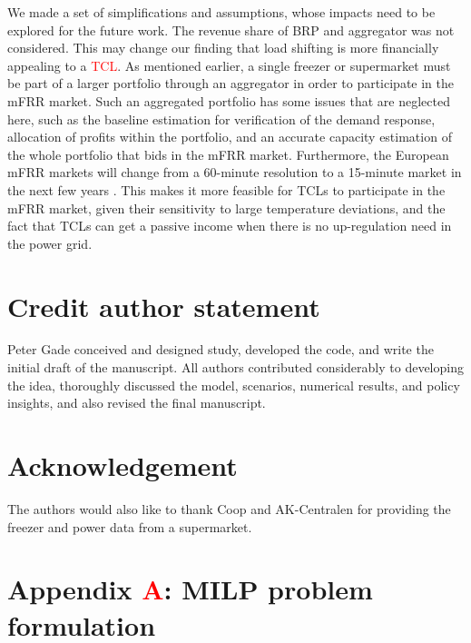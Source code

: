 \documentclass[11pt,a4paper]{article}
\begin{document}
We made a set of simplifications and assumptions, whose impacts need to be explored for the future work. The revenue share of BRP and aggregator was not considered. This may change our finding that load shifting is more financially appealing to a \textcolor{red}{TCL}. As mentioned earlier, a single freezer or supermarket must be part of a larger portfolio through an aggregator in order to participate in the mFRR market. Such an aggregated portfolio has some issues that are neglected here, such as the baseline estimation for verification of the demand response, allocation of profits within the portfolio, and an accurate capacity estimation of the whole portfolio that bids in the mFRR market. Furthermore, the European mFRR markets will change from a 60-minute resolution to a 15-minute market in the next few years \cite{MARI}. This makes it more feasible for TCLs to participate in the mFRR market, given their sensitivity to large temperature deviations, and the fact that TCLs can get a passive income when there is no up-regulation need in the power grid.

\section*{Credit author statement}
Peter Gade conceived and designed study, developed the code, and write the initial draft of the manuscript. All authors contributed considerably to developing the idea, thoroughly discussed the model, scenarios, numerical results, and policy insights, and also revised the final manuscript.

\section*{Acknowledgement}

The authors would also like to thank Coop and AK-Centralen for providing the freezer and power data from a supermarket.

\section*{Appendix \textcolor{red}{A}: MILP problem formulation}\label{appendix:A}
\end{document}

